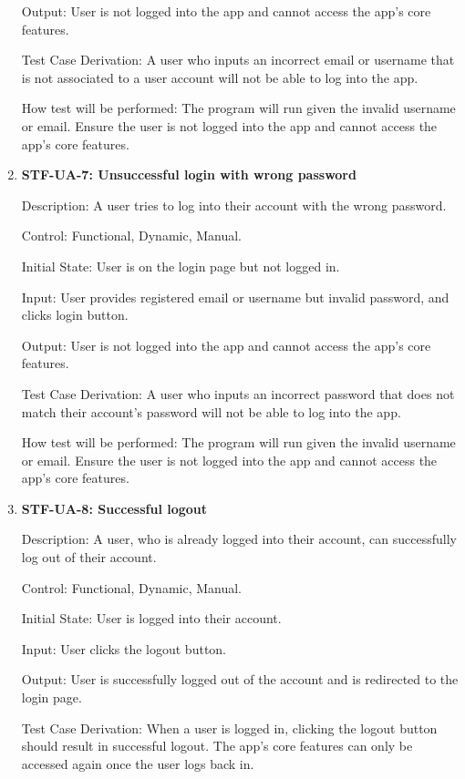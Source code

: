\documentclass[12pt, titlepage]{article}
\begin{document}
\begin{enumerate}
Output: User is not logged into the app and cannot access the app’s core features. 

Test Case Derivation: A user who inputs an incorrect email or username that is not associated to a user account will not be able to log into the app.

How test will be performed: The program will run given the invalid username or email. Ensure the user is not logged into the app and cannot access the app’s core features.

\item{\textbf{STF-UA-7: Unsuccessful login with wrong password}\\}

Description: A user tries to log into their account with the wrong password.
	
Control:  Functional, Dynamic, Manual.

Initial State: User is on the login page but not logged in.

Input: User provides registered email or username but invalid password, and clicks login button.

Output: User is not logged into the app and cannot access the app’s core features. 

Test Case Derivation: A user who inputs an incorrect password that does not match their account’s password will not be able to log into the app.

How test will be performed: The program will run given the invalid username or email. Ensure the user is not logged into the app and cannot access the app’s core features.
 
\item{\textbf{STF-UA-8: Successful logout}\\}

Description: A user, who is already logged into their account, can successfully log out of their account.
	
Control: Functional, Dynamic, Manual.

Initial State: User is logged into their account.

Input: User clicks the logout button.

Output: User is successfully logged out of the account and is redirected to the login page.

Test Case Derivation: When a user is logged in, clicking the logout button should result in successful logout. The app’s core features can only be accessed again once the user logs back in.
	

\end{enumerate}
\end{document}
